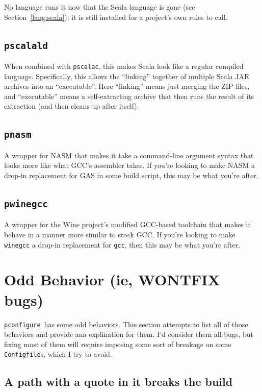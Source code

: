 \documentclass{article}
\newcommand{\pconfigure}{\texttt{pconfigure}}
\begin{document}
No language runs it now that the Scala language is gone (see
Section~\ref{lang:scala}); it is still installed for a project's own
rules to call.

\subsection{\texttt{pscalald} \label{prog:pscalald}}

When combined with \texttt{pscalac}, this makes Scala look like a
regular compiled language.  Specifically, this allows the ``linking''
together of multiple Scala JAR archives into an ``executable''.  Here
``linking'' means just merging the ZIP files, and ``executable'' means
a self-extracting archive that then runs the result of its extraction
(and then cleans up after itself).

\subsection{\texttt{pnasm} \label{prog:pnasm}}

A wrapper for NASM that makes it take a command-line argument syntax
that looks more like what GCC's assembler takes.  If you're looking to
make NASM a drop-in replacement for GAS in some build script, this may
be what you're after.

\subsection{\texttt{pwinegcc} \label{prog:pwinegcc}}

A wrapper for the Wine project's modified GCC-based toolchain that
makes it behave in a manner more similar to stock GCC.  If you're
looking to make \texttt{winegcc} a drop-in replacement for
\texttt{gcc}, then this may be what you're after.

\section{Odd Behavior (ie, WONTFIX bugs) \label{odd}}

\pconfigure\ has some odd behaviors.  This section attempts to list
all of those behaviors and provide ana explination for them.  I'd
consider them all bugs, but fixing most of them will require imposing
some sort of breakage on some \texttt{Configfile}s, which I try to
avoid.

\subsection{A path with a quote in it breaks the build
  \label{odd:quoting}}
\end{document}
